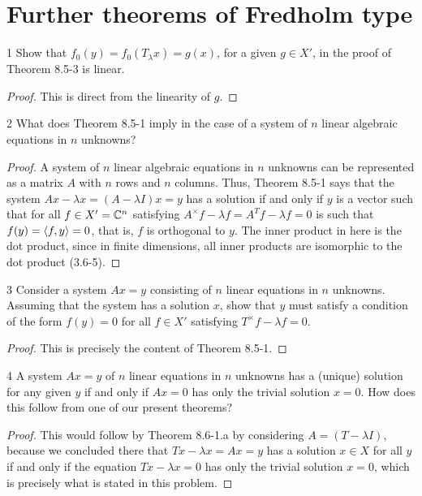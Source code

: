 \section{Further theorems of Fredholm type}


\begin{exercise}{1}
Show that $f_0(y) = f_0(T_\lambda x) = g(x)$, for a given $g \in X'$, in the proof of Theorem 8.5-3 is linear.
\end{exercise}
\begin{proof}
This is direct from the linearity of $g$.
\end{proof} 

\begin{exercise}{2}
What does Theorem 8.5-1 imply in the case of a system of $n$ linear algebraic equations in $n$ unknowns?
\end{exercise}
\begin{proof}
A system of $n$ linear algebraic equations in $n$ unknowns can be represented as a matrix $A$ with $n$ rows and $n$ columns.
Thus, Theorem 8.5-1 says that the system $A x - \lambda x = (A - \lambda I) x = y$ has a solution if and only if $y$ is a vector such that for all $f \in X' = \mathbb{C}^n$ satisfying $A^\times f - \lambda f = A^T f - \lambda f = 0$ is such that $f(y) = \langle f, y\rangle = 0$, that is, $f$ is orthogonal to $y$.
The inner product in here is the dot product, since in finite dimensions, all inner products are isomorphic to the dot product (3.6-5).
\end{proof} 

\begin{exercise}{3}
Consider a system $Ax = y$ consisting of $n$ linear equations in $n$ unknowns.
Assuming that the system  has a solution $x$, show that $y$ must satisfy a condition of the form $f(y) = 0$ for all $f \in X'$ satisfying $T^\times f - \lambda f = 0$.
\end{exercise}
\begin{proof}
This is precisely the content of Theorem 8.5-1.
\end{proof} 

\begin{exercise}{4}
A system $Ax = y$ of $n$ linear equations in $n$ unknowns has a (unique) solution for any given $y$ if and only if $Ax = 0$ has only the trivial solution $x = 0$.
How does this follow from one of our present theorems?
\end{exercise}
\begin{proof}
This would follow by Theorem 8.6-1.a by considering $A = (T - \lambda I)$, because we concluded there that $Tx - \lambda x = Ax = y$ has a solution $x \in X$ for all $y$ if and only if the equation $Tx - \lambda x = 0$ has only the trivial solution $x = 0$, which is precisely what is stated in this problem.
\end{proof} 

